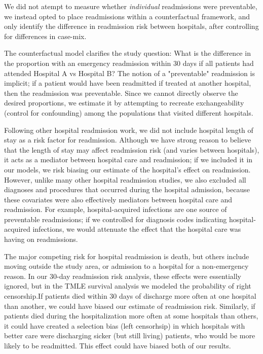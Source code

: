 \documentclass[]{article}\usepackage[]{graphicx}\usepackage[]{color}
\begin{document}
We did not atempt to measure whether \emph{individual} readmissions were preventable, we instead opted to place readmissions within a counterfactual framework, and only identify the difference in readmission risk between hospitals, after controlling for differences in case-mix. 

The counterfactual model clarifies the study question: What is the difference in the proportion with an emergency readmission within 30 days if all patients had attended Hospital A vs Hospital B? The notion of a "preventable" readmission is implicit; if a patient would have been readmitted if treated at another hospital, then the readmission was preventable. Since we cannot directly observe the desired proportions, we estimate it by attempting to recreate exchangeability (control for confounding) among the populations that visited different hospitals.

Following other hospital readmission work, we did not include hospital length of stay as a risk factor for readmission. Although we have strong reason to believe that the length of stay may affect readmission risk (and varies between hospitals), it acts as a mediator between hospital care and readmission; if we included it in our models, we risk biasing our estimate of the hospital's effect on readmission. However, unlike many other hospital readmission studies, we also excluded all diagnoses and procedures that occurred during the hospital admission, because these covariates were also effectively mediators between hospital care and readmission. For example, hospital-acquired infections are one source of preventable readmissions; if we controlled for diagnosis codes indicating hospital-acquired infections, we would attenuate the effect that the hospital care was having on readmissions.

The major competing risk for hospital readmission is death, but others include moving outside the study area, or admission to a hospital for a non-emergency reason. In our 30-day readmission risk analysis, these effects were essentially ignored, but in the TMLE survival analysis we modeled the probability of right censorship.If patients died within 30 days of discharge more often at one hospital than another, we could have biased our estimate of readmission risk. Similarly, if patients died during the hospitalization more often at some hospitals than others, it could have created a selection bias (left censorhsip) in which hospitals with better care were discharging sicker (but still living) patients, who would be more likely to be readmitted. This effect could have biased both of our results.
\end{document}

